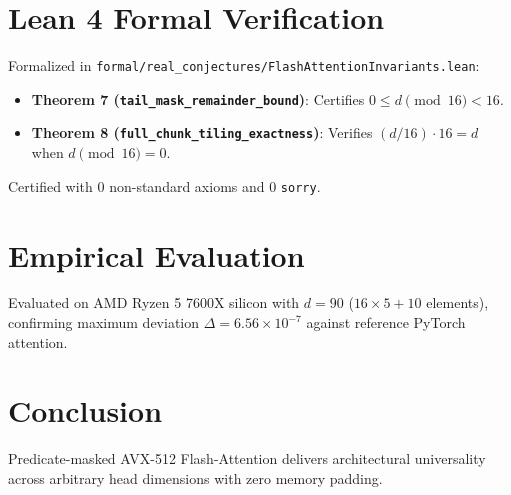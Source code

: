 \documentclass[10pt,twocolumn,letterpaper]{article}
\begin{document}
\section{Lean 4 Formal Verification}
Formalized in \texttt{formal/real\_conjectures/FlashAttentionInvariants.lean}:
\begin{itemize}
    \item \textbf{Theorem 7 (\texttt{tail\_mask\_remainder\_bound})}: Certifies $0 \le d \pmod{16} < 16$.
    \item \textbf{Theorem 8 (\texttt{full\_chunk\_tiling\_exactness})}: Verifies $(d / 16) \cdot 16 = d$ when $d \pmod{16} = 0$.
\end{itemize}
Certified with 0 non-standard axioms and 0 \texttt{sorry}.

\section{Empirical Evaluation}
Evaluated on AMD Ryzen 5 7600X silicon with $d = 90$ ($16 \times 5 + 10$ elements), confirming maximum deviation $\Delta = 6.56 \times 10^{-7}$ against reference PyTorch attention.

\section{Conclusion}
Predicate-masked AVX-512 Flash-Attention delivers architectural universality across arbitrary head dimensions with zero memory padding.
\end{document}
